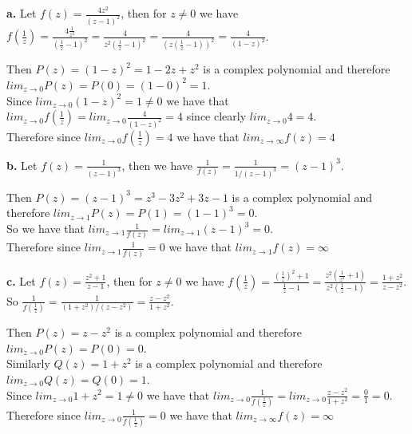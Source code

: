 \documentclass{article}
\begin{document}
{\Large\textbf{a.}} Let $f(z) =\frac{4z^2}{(z-1)^2}$, then for $z\neq 0$ we have $f(\frac{1}{z}) =\frac{4\frac{1}{z^2}}{(\frac{1}{z} - 1)^2} =\frac{4}{z^2(\frac{1}{z} - 1)^2} =\frac{4}{(z(\frac{1}{z} - 1))^2} =\frac{4}{(1 - z)^2}$.
\begin{center}
    \doublespacing
    Then $P(z) = (1 - z)^2 = 1 - 2z + z^2$ is a complex polynomial and therefore $lim _{z\rightarrow 0} P(z) = P(0) = (1 - 0)^2 = 1$.
    \\Since $lim _{z\rightarrow 0} (1 - z)^2 = 1\neq 0$ we have that $lim _{z\rightarrow 0} f(\frac{1}{z}) = lim _{z\rightarrow 0}\frac{4}{(1 - z)^2} = 4$ since clearly $lim _{z\rightarrow 0} 4 = 4$.
    \\Therefore since $lim _{z\rightarrow 0} f(\frac{1}{z}) = 4$ we have that $lim _{z\rightarrow\infty} f(z) = 4$ \qedsymbol
\end{center}

{\Large\textbf{b.}} Let $f(z) =\frac{1}{(z - 1)^3}$, then we have $\frac{1}{f(z)} =\frac{1}{1 / (z - 1)^3} = (z - 1)^3$.
\begin{center}
    \doublespacing
    Then $P(z) = (z - 1)^3 = z^3 - 3z^2 + 3z - 1$ is a complex polynomial and therefore $lim _{z\rightarrow 1} P(z) = P(1) = (1 - 1)^3 = 0$.
    \\So we have that $lim _{z\rightarrow 1}\frac{1}{f(z)} = lim _{z\rightarrow 1} (z - 1)^3 = 0$.
    \\Therefore since $lim _{z\rightarrow 1}\frac{1}{f(z)} = 0$ we have that $lim _{z\rightarrow 1} f(z) =\infty$ \qedsymbol
\end{center}

{\Large\textbf{c.}} Let $f(z) =\frac{z^2 + 1}{z - 1}$, then for $z\neq 0$ we have $f(\frac{1}{z}) =\frac{(\frac{1}{z})^2 + 1}{\frac{1}{z} - 1} =\frac{z^2 (\frac{1}{z^2} + 1)}{z^2 (\frac{1}{z} - 1)} =\frac{1 + z^2}{z - z^2}$. So $\frac{1}{f(\frac{1}{z})} =\frac{1}{(1 + z^2) / (z - z^2)} =\frac{z - z^2}{1 + z^2}$.
\begin{center}
    \doublespacing
    Then $P(z) = z - z^2$ is a complex polynomial and therefore $lim _{z\rightarrow 0} P(z) = P(0) = 0$.
    \\Similarly $Q(z) = 1 + z^2$ is a complex polynomial and therefore $lim _{z\rightarrow 0} Q(z) = Q(0) = 1$.
    \\Since $lim _{z\rightarrow 0} 1 + z^2 = 1\neq 0$ we have that $lim _{z\rightarrow 0}\frac{1}{f(\frac{1}{z})} = lim _{z\rightarrow 0}\frac{z - z^2}{1 + z^2} =\frac{0}{1} = 0$.
    \\Therefore since $lim _{z\rightarrow 0}\frac{1}{f(\frac{1}{z})} = 0$ we have that $lim _{z\rightarrow\infty} f(z) =\infty$ \qedsymbol
\end{center}
\end{document}
